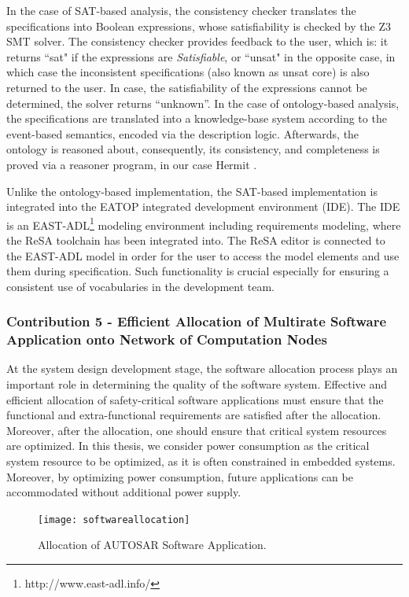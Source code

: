 In the case of SAT-based analysis, the consistency checker translates the specifications into Boolean expressions, whose satisfiability is checked by the Z3 SMT solver. The consistency checker provides feedback to the user, which is: it returns ``sat" if the expressions are \textit{Satisfiable}, or ``unsat" in the opposite case, in which case the inconsistent specifications (also known as unsat core) is also returned to the user. In case, the satisfiability of the expressions cannot be determined, the solver returns ``unknown''. In the case of ontology-based analysis, the specifications are translated into a knowledge-base system according to the event-based semantics, encoded via the description logic. Afterwards, the ontology is reasoned about, consequently, its consistency, and completeness is proved via a reasoner program, in our case Hermit \cite{conf/owled/ShearerMH08}.

Unlike the ontology-based implementation, the SAT-based implementation is integrated into the EATOP integrated development environment (IDE). The IDE is an EAST-ADL\footnote{http://www.east-adl.info/} modeling environment including requirements modeling, where the ReSA toolchain has been integrated into. The ReSA editor is connected to the EAST-ADL model in order for the user to access the model elements and use them during specification. Such functionality is crucial especially for ensuring a consistent use of vocabularies in the development team.

\subsubsection{Contribution 5 - Efficient Allocation of Multirate Software Application onto Network of Computation Nodes}\label{contribution_allocation}
At the system design development stage, the software allocation process plays an important role in determining the quality of the software system. Effective and efficient allocation of safety-critical software applications must ensure that the functional and extra-functional requirements are satisfied after the allocation. Moreover, after the allocation, one should ensure that critical system resources are optimized. In this thesis, we consider power consumption as the critical system resource to be optimized, as it is often constrained in embedded systems. Moreover, by optimizing power consumption, future applications can be accommodated without additional power supply.
\begin{figure}[h!]
	\centering
	\texttt{[image: softwareallocation]}
	\caption{Allocation of AUTOSAR Software Application.}
	\label{fig_system}
\end{figure}


